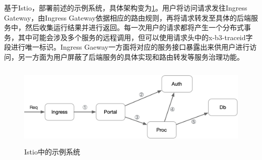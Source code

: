 \documentclass[12pt,a4paper]{article}
\begin{document}
基于Istio，部署前述的示例系统，具体架构变为\ref{fig:demo_arch_on_istio}。用户将访问请求发往Ingress Gateway，由Ingress Gateway依据相应的路由规则，再将请求转发至具体的后端服务中，然后收集运行结果并进行返回。每一次用户的请求都将产生一个分布式事务，其中可能会涉及多个服务的远程调用，但可以使用请求头中的x-b3-traceid字段进行唯一标识。Ingress Gaeway一方面将对应的服务接口暴露出来供用户进行访问，另一方面为用户屏蔽了后端服务的具体实现和路由转发等服务治理功能。

\begin{figure}[ht]
 \centering
 \includegraphics[height=4cm]{images/demo_arch_on_istio.png}
 \caption{Istio中的示例系统}
 \label{fig:demo_arch_on_istio}
\end{figure}
\end{document}
